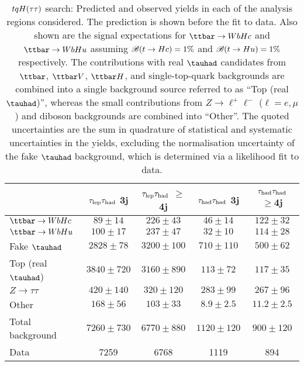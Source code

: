 \begin{table}[htbp]
\small
\begin{center}
\begin{tabular}{l*{4}{c}}
\hline\hline
 & $\tau_{\mathrm{lep}} \tau_{\mathrm{had}}$ 3j & $\tau_{\mathrm{lep}} \tau_{\mathrm{had}}$ $\geq$4j & $\tau_{\mathrm{had}} \tau_{\mathrm{had}}$ 3j &  $\tau_{\mathrm{had}} \tau_{\mathrm{had}}$ $\geq$4j \\
\hline
$\Hc$  &   $ 89 \pm 14 $ &   $ 226 \pm 43 $ &   $ 46 \pm 14 $ &   $ 122 \pm 32 $ \\ 
$\Hu$  &   $ 100 \pm 17 $ &   $ 237 \pm 47 $ &   $ 32 \pm 10 $ &   $ 114 \pm 28 $ \\ 
\hline
Fake $\tauhad$  &   $ 2828 \pm 78 $ &   $ 3200 \pm 100 $ &   $ 710 \pm 110 $ &   $ 500 \pm 62 $ \\
Top (real $\tauhad$)  &   $ 3840 \pm 720 $ &   $ 3160 \pm 890 $ &   $ 113 \pm 72 $ &   $ 117 \pm 35 $ \\  
$Z \to \tau\tau$  &   $ 420 \pm 140 $ &   $ 320 \pm 120 $ &   $ 283 \pm 99 $ &   $ 267 \pm 96 $ \\ 
Other  &   $ 168 \pm 56 $ &   $ 103 \pm 33 $ &   $ 8.9 \pm 2.5 $ &   $ 11.2 \pm 2.5 $ \\ 
\hline
Total background  &   $ 7260 \pm 730 $ &   $ 6770 \pm 880 $ &   $ 1120 \pm 120 $ &   $ 900 \pm 120 $ \\ 
\hline
Data  & 7259  & 6768  & 1119  & 894  \\
\hline\hline    
\end{tabular}

%
\end{center}
\caption{
$tqH(\tau\tau)$ search: Predicted and observed yields in each of the analysis regions considered.
The prediction is shown before the fit to data. Also shown are the signal expectations for 
$\Hc$ and $\Hu$ assuming $\mathscr{B}(t\to Hc)=1\%$ and $\mathscr{B}(t\to Hu)=1\%$ respectively.
The contributions with real $\tauhad$ candidates from $\ttbar$,  $\ttbar V$, $\ttbar H$, and single-top-quark backgrounds are combined into
a single background source referred to as ``Top (real $\tauhad$)'', whereas the small contributions from 
$Z\to \ell^+\ell^-$ ($\ell = e, \mu$) and diboson backgrounds are combined into ``Other''. 
The quoted uncertainties are the sum in quadrature of statistical and systematic uncertainties in the yields, 
excluding the normalisation uncertainty of the fake $\tauhad$ background, which is determined via a likelihood fit to data.
}
\label{tab:Htautau_Prefit_Yields_Unblind}
\end{table} 


